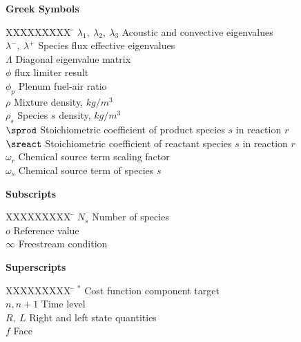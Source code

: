 \begin{nomenclature}
\textbf{Greek Symbols}
\begin{tabbing}
  XXXXXXXXX \= \kill%
  $\lambda_1,\ \lambda_2,\ \lambda_3$ \> Acoustic and convective eigenvalues \\
  $\lambda^-,\ \lambda^+$ \> Species flux effective eigenvalues \\
  $\Lambda$ \> Diagonal eigenvalue matrix \\
  $\phi$ \> flux limiter result \\
  $\phi_p$ \> Plenum fuel-air ratio \\
  $\rho$ \> Mixture density, $kg/m^3$ \\
  $\rho_s$ \> Species $s$ density, $kg/m^3$ \\
  $\sprod$ \> Stoichiometric coefficient of product species $s$ in reaction $r$ \\
  $\sreact$ \> Stoichiometric coefficient of reactant species $s$ in reaction $r$ \\
  $\omega_r$ \> Chemical source term scaling factor \\
  $\omega_s$ \> Chemical source term of species $s$ \\
\end{tabbing}

\clearpage

\textbf{Subscripts}
\begin{tabbing}
  XXXXXXXXX \= \kill%
  $N_s$ \> Number of species \\
  $o$ \> Reference value \\
  $\infty$ \> Freestream condition \\
\end{tabbing}

\clearpage

\textbf{Superscripts}
\begin{tabbing}
  XXXXXXXXX \= \kill%
  $^*$ \> Cost function component target \\
  $n, n+1$ \> Time level \\
  $R,\ L$ \> Right and left state quantities \\
  $f$ \> Face
\end{tabbing}

\end{nomenclature}
